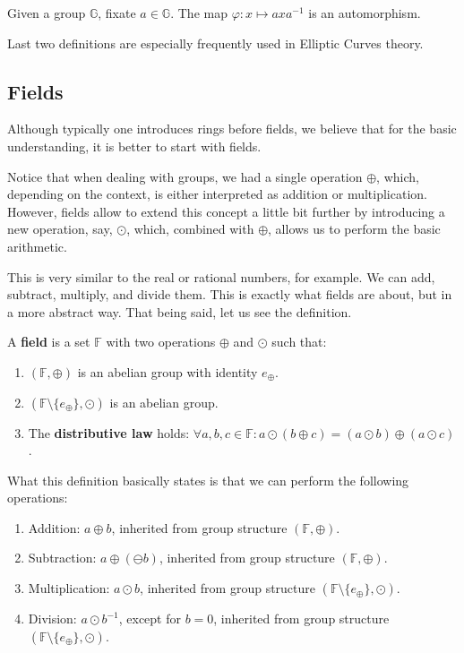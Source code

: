 \documentclass[../lecture-notes-148x210.tex]{subfiles}
\begin{document}
\begin{example}
    Given a group $\mathbb{G}$, fixate $a \in \mathbb{G}$. The map $\varphi: x \mapsto axa^{-1}$ is an automorphism.
\end{example}

Last two definitions are especially frequently used in Elliptic Curves theory.

\subsection{Fields}

Although typically one introduces rings before fields, we believe that for the basic understanding, it is better to start with fields. 

Notice that when dealing with groups, we had a single operation $\oplus$, which, depending on the context, is either interpreted as addition or multiplication. 
However, fields allow to extend this concept a little bit further by introducing a new operation, say, $\odot$, which, combined with $\oplus$, allows us to perform the basic arithmetic.

This is very similar to the real or rational numbers, for example. We can add, subtract, multiply, and divide them. This is exactly what fields are about, but in a more abstract way. That being said, let us see the definition.

\begin{definition}
    A \textbf{field} is a set $\mathbb{F}$ with two operations $\oplus$ and $\odot$ such that:
    \begin{enumerate}
        \item $(\mathbb{F}, \oplus)$ is an abelian group with identity $e_{\oplus}$.
        \item $(\mathbb{F} \setminus \{e_{\oplus}\}, \odot)$ is an abelian group.
        \item The \textbf{distributive law} holds: $\forall a,b,c \in \mathbb{F}: a \odot (b \oplus c) = (a \odot b) \oplus (a \odot c)$.
    \end{enumerate}
\end{definition}

What this definition basically states is that we can perform the following operations:
\begin{enumerate}
    \item Addition: $a \oplus b$, inherited from group structure $(\mathbb{F}, \oplus)$.
    \item Subtraction: $a \oplus (\ominus b)$, inherited from group structure $(\mathbb{F}, \oplus)$.
    \item Multiplication: $a \odot b$, inherited from group structure $(\mathbb{F} \setminus \{e_{\oplus}\}, \odot)$.
    \item Division: $a \odot b^{-1}$, except for $b=0$, inherited from group structure $(\mathbb{F} \setminus \{e_{\oplus}\}, \odot)$.
\end{enumerate}
\end{document}
